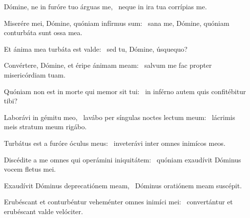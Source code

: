 \item Dómine, ne in furóre tuo árguas me,~\psstar{} neque in ira tua corrípias me.

\item Miserére mei, Dómine, quóniam infírmus sum:~\psstar{} sana me, Dómine, quóniam conturbáta sunt ossa mea.

\item Et ánima mea turbáta est valde:~\psstar{} sed tu, Dómine, úsquequo?

\item Convértere, Dómine, et éripe ánimam meam:~\psstar{} salvum me fac propter misericórdiam tuam.

\item Quóniam non est in morte qui memor sit tui:~\psstar{} in inférno autem quis confitébitur tibi?

\item Laborávi in gémitu meo,~\pscross{} la\-vábo per síngulas noctes lectum meum:~\psstar{} lácrimis meis stratum meum rigábo.

\item Turbátus est a furóre óculus meus:~\psstar{} inveterávi inter omnes inimícos meos.

\item Discédite a me omnes qui operámini iniquitátem:~\psstar{} quóniam exaudívit Dóminus vocem fletus mei.

\item Exaudívit Dóminus deprecatiónem meam,~\psstar{} Dóminus oratiónem meam suscépit.

\item Erubéscant et conturbéntur veheménter omnes inimíci mei:~\psstar{} convertántur et erubéscant valde velóciter.

